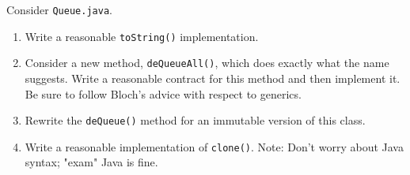 Consider {\tt Queue.java}.

\begin{enumerate}
\item
Write a reasonable {\tt toString()} implementation.

\item
Consider a new method, {\tt deQueueAll()}, which does exactly 
what the name suggests.
Write a reasonable contract for this method
and then implement it.  Be sure to follow Bloch's advice with
respect to generics.

\item
Rewrite the {\tt deQueue()} method for an immutable version of this class.

\item
Write a reasonable implementation of {\tt clone()}.  
Note: Don't worry about Java syntax; "exam" Java is fine.

\end{enumerate}




